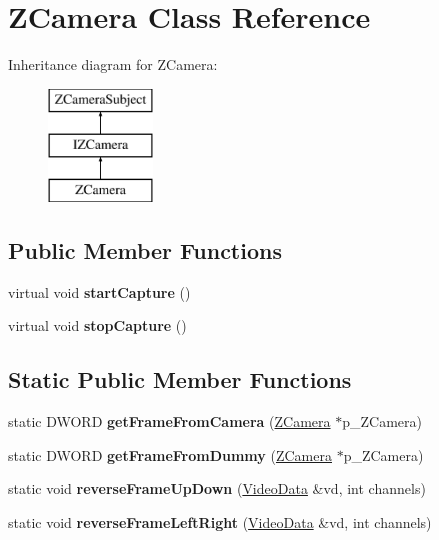 \hypertarget{classZCamera}{
\section{ZCamera Class Reference}
\label{classZCamera}
}
Inheritance diagram for ZCamera:\begin{figure}[H]
\begin{center}
\leavevmode
\includegraphics[height=3cm]{classZCamera}
\end{center}
\end{figure}
\subsection*{Public Member Functions}
\begin{DoxyCompactItemize}
\item 
\hypertarget{classZCamera_a9eb62d7424767779dc46cc357ae77645}{
virtual void {\bfseries startCapture} ()}
\label{classZCamera_a9eb62d7424767779dc46cc357ae77645}

\item 
\hypertarget{classZCamera_af883a28008906c04065644c5e8eb4e40}{
virtual void {\bfseries stopCapture} ()}
\label{classZCamera_af883a28008906c04065644c5e8eb4e40}

\end{DoxyCompactItemize}
\subsection*{Static Public Member Functions}
\begin{DoxyCompactItemize}
\item 
\hypertarget{classZCamera_a55bad191a7042af5df1f81fab4c6b28a}{
static DWORD {\bfseries getFrameFromCamera} (\hyperlink{classZCamera}{ZCamera} $\ast$p\_\-ZCamera)}
\label{classZCamera_a55bad191a7042af5df1f81fab4c6b28a}

\item 
\hypertarget{classZCamera_a4e42174ae451fd02e5dc45452165aa8e}{
static DWORD {\bfseries getFrameFromDummy} (\hyperlink{classZCamera}{ZCamera} $\ast$p\_\-ZCamera)}
\label{classZCamera_a4e42174ae451fd02e5dc45452165aa8e}

\item 
\hypertarget{classZCamera_a723ebde9648512ab731c0c1f0b82ac22}{
static void {\bfseries reverseFrameUpDown} (\hyperlink{structVideoData}{VideoData} \&vd, int channels)}
\label{classZCamera_a723ebde9648512ab731c0c1f0b82ac22}

\item 
\hypertarget{classZCamera_a71f106ccc5d3b25d733c9852be1a5641}{
static void {\bfseries reverseFrameLeftRight} (\hyperlink{structVideoData}{VideoData} \&vd, int channels)}
\label{classZCamera_a71f106ccc5d3b25d733c9852be1a5641}

\end{DoxyCompactItemize}


